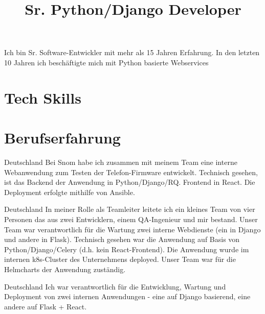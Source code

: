 \documentclass[11pt,a4paper,sans]{moderncv}
\title{Sr. Python/Django Developer}
\begin{document}
    \makecvtitle

    Ich bin Sr. Software-Entwickler mit mehr als 15 Jahren Erfahrung. In den
    letzten 10 Jahren ich beschäftigte mich mit Python basierte Webservices

    \section{Tech Skills}

    \section{Berufserfahrung}

     { Deutschland }{ Bei Snom habe ich zusammen mit meinem Team eine interne
     Webanwendung zum Testen der Telefon-Firmware entwickelt. Technisch
     gesehen, ist das Backend der Anwendung in Python/Django/RQ. Frontend in
     React. Die Deployment erfolgte mithilfe von Ansible.}

     { Deutschland }{ In meiner Rolle als Teamleiter leitete ich ein kleines
     Team von vier Personen das aus zwei Entwicklern, einem QA-Ingenieur und
     mir bestand. Unser Team war verantwortlich für die Wartung
     zwei interne Webdienste (ein in Django und andere in Flask).
     Technisch gesehen war die Anwendung auf Basis
     von Python/Django/Celery (d.h. kein React-Frontend). Die Anwendung wurde im
     internen k8s-Cluster des Unternehmens deployed. Unser Team war für
     die Helmcharts der Anwendung zuständig.}

   \vspace{0.4cm}

     { Deutschland }{ Ich war verantwortlich für die Entwicklung, Wartung und
     Deployment von zwei internen Anwendungen - eine auf Django basierend,
     eine andere auf Flask + React.}
\end{document}
